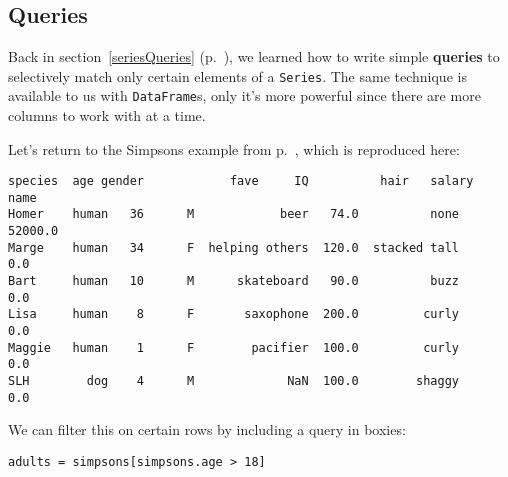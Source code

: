 
\chapter[Tables in Python (3 of 3)]{\huge\selectfont{Tables in Python (3 of
3)}}
\label{tablesInPython3}

\section{Queries}

\label{queries}

Back in section~\ref{seriesQueries} (p.~\pageref{seriesQueries}), we learned
how to write simple \textbf{queries} to selectively match only certain elements
of a \texttt{Series}. The same technique is available to us with
\texttt{DataFrame}s, only it's more powerful since there are more columns to
work with at a time.


Let's return to the Simpsons example from p.~\pageref{finalSimpsons}, which is
reproduced here:

\begin{Verbatim}[fontsize=\footnotesize,samepage=true,frame=leftline,framesep=5mm,framerule=1mm]
       species  age gender            fave     IQ          hair   salary
name                                                                    
Homer    human   36      M            beer   74.0          none  52000.0
Marge    human   34      F  helping others  120.0  stacked tall      0.0
Bart     human   10      M      skateboard   90.0          buzz      0.0
Lisa     human    8      F       saxophone  200.0         curly      0.0
Maggie   human    1      F        pacifier  100.0         curly      0.0
SLH        dog    4      M             NaN  100.0        shaggy      0.0
\end{Verbatim}


We can filter this on certain rows by including a query in boxies:


\begin{Verbatim}[fontsize=\normalsize,samepage=true,frame=single,framesep=3mm]
adults = simpsons[simpsons.age > 18]
\end{Verbatim}
\vspace{-.2in}

